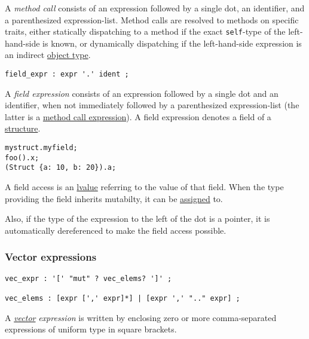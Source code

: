 \documentclass[]{article}
\begin{document}
A \emph{method call} consists of an expression followed by a single dot,
an identifier, and a parenthesized expression-list. Method calls are
resolved to methods on specific traits, either statically dispatching to
a method if the exact \texttt{self}-type of the left-hand-side is known,
or dynamically dispatching if the left-hand-side expression is an
indirect \hyperref[object-types]{object type}.


\begin{verbatim}
field_expr : expr '.' ident ;
\end{verbatim}

A \emph{field expression} consists of an expression followed by a single
dot and an identifier, when not immediately followed by a parenthesized
expression-list (the latter is a
\hyperref[method-call-expressions]{method call expression}). A field
expression denotes a field of a \hyperref[structure-types]{structure}.

\begin{verbatim}
mystruct.myfield;
foo().x;
(Struct {a: 10, b: 20}).a;
\end{verbatim}

A field access is an
\hyperref[lvaluesux2c-rvalues-and-temporaries]{lvalue} referring to the
value of that field. When the type providing the field inherits
mutabilty, it can be \hyperref[assignment-expressions]{assigned} to.

Also, if the type of the expression to the left of the dot is a pointer,
it is automatically dereferenced to make the field access possible.

\subsubsection{Vector expressions}\label{vector-expressions}

\begin{verbatim}
vec_expr : '[' "mut" ? vec_elems? ']' ;

vec_elems : [expr [',' expr]*] | [expr ',' ".." expr] ;
\end{verbatim}

A \hyperref[vector-types]{\emph{vector}} \emph{expression} is written by
enclosing zero or more comma-separated expressions of uniform type in
square brackets.
\end{document}
